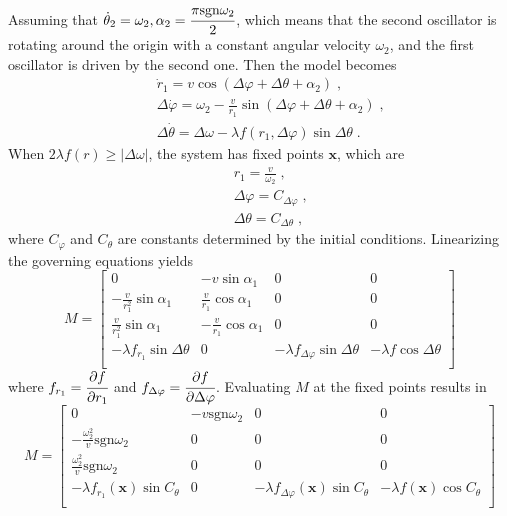 \documentclass{article}
\begin{document}
Assuming that $\dot{\theta}_2=\omega _2, \alpha_2=\cfrac{\pi\text{sgn}\omega_2}{2}$, which means that the second oscillator is rotating around the origin with a constant angular velocity $\omega_2$, and the first oscillator is driven by the second one. Then the model becomes
\begin{eqnarray}
    &&\dot{r}_1=v\cos \left( \Delta \varphi +\Delta \theta +\alpha _2 \right)\;,\\
    &&\Delta \dot{\varphi}=\omega _2-\frac{v}{r_1}\sin \left( \Delta \varphi +\Delta \theta +\alpha _2 \right)\;,\\
    &&\Delta \dot{\theta}=\Delta \omega -\lambda f\left( r_1,\Delta \varphi \right) \sin \Delta \theta\;.
\end{eqnarray}
When $2\lambda f\left( r \right) \geqslant \left| \Delta \omega \right|$, the system has fixed points $\mathbf{x}$, which are
\begin{eqnarray}
    &&r_1=\frac{v}{\omega _2}\;,\\
	&&\Delta \varphi =C_{\Delta\varphi}\;,\\
	&&\Delta \theta =C_{\Delta\theta}\;,
\end{eqnarray}
where $C_{\varphi}$ and $C_{\theta}$ are constants determined by the initial conditions. Linearizing the governing equations yields
\begin{equation}
    M=\left[ \begin{matrix}
        0&		-v\sin \alpha _1&		0&		0\\
        -\frac{v}{r_{1}^{2}}\sin \alpha _1&		\frac{v}{r_1}\cos \alpha _1&		0&		0\\
        \frac{v}{r_{1}^{2}}\sin \alpha _1&		-\frac{v}{r_1}\cos \alpha _1&		0&		0\\
        -\lambda f_{r_1}\sin \Delta \theta&		0&		-\lambda f_{\Delta \varphi}\sin \Delta \theta&		-\lambda f\cos \Delta \theta\\
    \end{matrix} \right] 
\end{equation}
where $f_{r_1}=\cfrac{\partial f}{\partial r_1}$ and $f_{\Delta \varphi}=\cfrac{\partial f}{\partial \Delta \varphi}$. Evaluating $M$ at the fixed points results in
\begin{equation}
    M=\left[ \begin{matrix}
        0&		-v\text{sgn} \omega _2&		0&		0\\
        -\frac{\omega _{2}^{2}}{v}\text{sgn} \omega _2&		0&		0&		0\\
        \frac{\omega _{2}^{2}}{v}\text{sgn} \omega _2&		0&		0&		0\\
        -\lambda f_{r_1}\left( \mathbf{x} \right) \sin C_{\theta}&		0&		-\lambda f_{\Delta \varphi}\left( \mathbf{x} \right) \sin C_{\theta}&		-\lambda f\left( \mathbf{x} \right) \cos C_{\theta}\\
    \end{matrix} \right] 
\end{equation}
\end{document}
